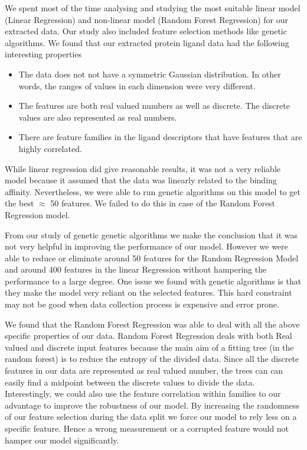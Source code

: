 \documentclass[11pt]{article}
\begin{document}
We spent most of the time analysing and studying the most suitable linear model (Linear Regression) and non-linear model (Random Forest Regression) for our extracted data.
Our study also included feature selection methods like genetic algorithms.
We found that our extracted protein ligand data had the following interesting properties
\begin{itemize}
\item The data does not not have a symmetric Gaussian distribution.  In other words, the ranges of values in each dimension were very different.
\item The features are both real valued numbers as well as discrete.  The discrete values are also represented as real numbers.
\item There are feature families in the ligand descriptors that have features that are highly correlated.
\end{itemize}

While linear regression did give reasonable results,  it was not a very reliable model because it assumed that the data was linearly related to the binding affinity.
Nevertheless,  we were able to run genetic algorithms on this model to get the best $\approx$ 50 features.
We failed to do this in case of the Random Forest Regression model.

From our study of genetic genetic algorithms we make the conclusion that it was not very helpful in improving the performance of our model. However we were able to reduce or eliminate around 50 features for the Random Regression Model and around 400 features in the linear Regression without hampering the performance to a large degree.
One issue we found with genetic algorithms is that they make the model very reliant on the selected features.
This hard constraint may not be good when data collection process is expensive and error prone.

We found that the Random Forest Regression was able to deal with all the above specific properties of our data.
Random Forest Regression deals with both Real valued and discrete input features because the main aim of a fitting tree (in the random forest) is to reduce the entropy of the divided data.
Since all the discrete features in our data are represented as real valued number,  the trees can can easily find a midpoint between the discrete values to divide the data. 
Interestingly,  we could also use the feature correlation within families to our advantage to improve the robustness of our model. 
By increasing the randomness of our feature selection during the data split we force our model to rely less on a specific feature.
Hence a wrong measurement or a corrupted feature would not hamper our model significantly.
\end{document}
